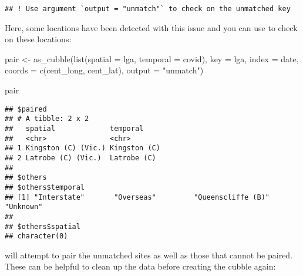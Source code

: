 \documentclass{article}
\newenvironment{Shaded}{\begin{snugshade}}{\end{snugshade}}
\newcommand{\AttributeTok}[1]{\textcolor[rgb]{0.77,0.63,0.00}{#1}}
\newcommand{\FunctionTok}[1]{\textcolor[rgb]{0.00,0.00,0.00}{#1}}
\newcommand{\NormalTok}[1]{#1}
\newcommand{\OtherTok}[1]{\textcolor[rgb]{0.56,0.35,0.01}{#1}}
\newcommand{\StringTok}[1]{\textcolor[rgb]{0.31,0.60,0.02}{#1}}
\begin{document}
\begin{verbatim}
## ! Use argument `output = "unmatch"` to check on the unmatched key
\end{verbatim}

Here, some locations have been detected with this issue and you can use  to check on these locations:

\begin{Shaded}
\begin{Highlighting}[]
\NormalTok{pair }\OtherTok{\textless{}{-}} \FunctionTok{as\_cubble}\NormalTok{(}\FunctionTok{list}\NormalTok{(}\AttributeTok{spatial =}\NormalTok{ lga, }\AttributeTok{temporal =}\NormalTok{ covid),}
                \AttributeTok{key =}\NormalTok{ lga, }\AttributeTok{index =}\NormalTok{ date, }\AttributeTok{coords =} \FunctionTok{c}\NormalTok{(cent\_long, cent\_lat),}
                \AttributeTok{output =} \StringTok{"unmatch"}\NormalTok{)}

\NormalTok{pair}
\end{Highlighting}
\end{Shaded}

\begin{verbatim}
## $paired
## # A tibble: 2 x 2
##   spatial             temporal    
##   <chr>               <chr>       
## 1 Kingston (C) (Vic.) Kingston (C)
## 2 Latrobe (C) (Vic.)  Latrobe (C) 
## 
## $others
## $others$temporal
## [1] "Interstate"       "Overseas"         "Queenscliffe (B)" "Unknown"         
## 
## $others$spatial
## character(0)
\end{verbatim}

 will attempt to pair the unmatched sites as well as those that cannot be paired. These can be helpful to clean up the data before creating the cubble again:
\end{document}
